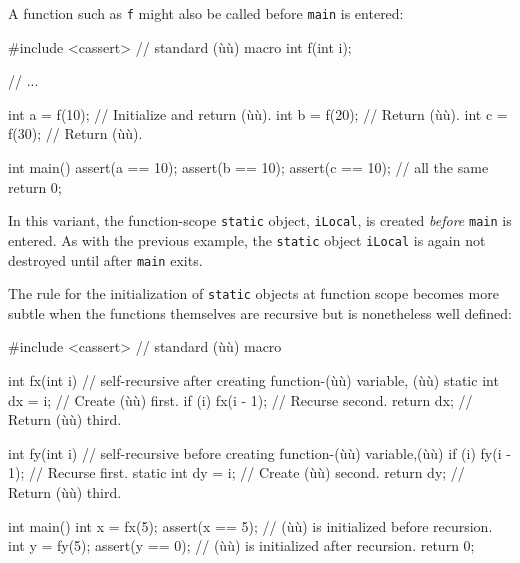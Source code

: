 A function such as \lstinline!f! might also be called before \lstinline!main!
is entered:

\begin{emcppshiddenlisting}[emcppsbatch=e1]
#include <cassert>  // standard (ù{}ù) macro
int f(int i);
\end{emcppshiddenlisting}
\begin{emcppslisting}[emcppsbatch=e1]
// ...

int a = f(10);  // Initialize and return (ù{}ù).
int b = f(20);  // Return (ù{}ù).
int c = f(30);  // Return (ù{}ù).

int main()
{
    assert(a == 10);  assert(b == 10);  assert(c == 10);  // all the same
    return 0;
}
\end{emcppslisting}

\noindent In this variant, the function-scope \lstinline!static! object,
\lstinline!iLocal!, is created \emph{before} \lstinline!main! is entered. As
with the previous example, the \lstinline!static! object
\lstinline!iLocal! is again not destroyed until after \lstinline!main! exits.

The rule for the initialization of \lstinline!static! objects at function
scope becomes more subtle when the functions themselves are recursive
but is nonetheless well defined:

\begin{emcppshiddenlisting}[emcppsbatch=e2]
#include <cassert>  // standard (ù{}ù) macro
\end{emcppshiddenlisting}
\begin{emcppslisting}[emcppsbatch=e2]
int fx(int i)  // self-recursive after creating function-(ù{}ù) variable, (ù{}ù)
{
    static int dx = i;     // Create (ù{}ù) first.
    if (i) { fx(i - 1); }  // Recurse second.
    return dx;             // Return (ù{}ù) third.
}

int fy(int i)  // self-recursive before creating function-(ù{}ù) variable,(ù{}ù)
{
    if (i) { fy(i - 1); }  // Recurse first.
    static int dy = i;     // Create (ù{}ù) second.
    return dy;             // Return (ù{}ù) third.
}

int main()
{
    int x = fx(5);  assert(x == 5);  // (ù{}ù) is initialized before recursion.
    int y = fy(5);  assert(y == 0);  // (ù{}ù) is initialized after recursion.
    return 0;
}
\end{emcppslisting}


